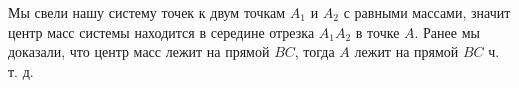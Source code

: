 Мы свели нашу систему точек к двум точкам $A_1$ и $A_2$ с равными массами, значит центр масс системы находится в середине отрезка $A_1A_2$ в точке $A$. 
Ранее мы доказали, что центр масс лежит на прямой $BC$, тогда $A$ лежит на прямой $BC$ ч. т. д.


